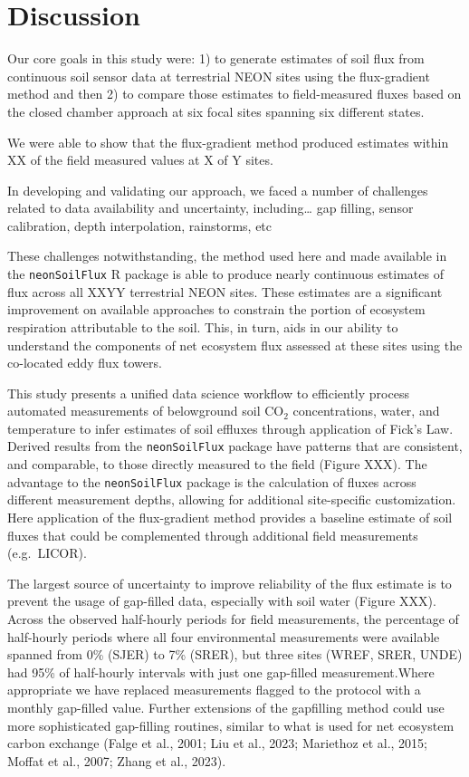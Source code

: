 \documentclass[
  letterpaper,
  DIV=11,
  numbers=noendperiod]{scrartcl}
\begin{document}
\section{Discussion}\label{discussion}

Our core goals in this study were: 1) to generate estimates of soil flux
from continuous soil sensor data at terrestrial NEON sites using the
flux-gradient method and then 2) to compare those estimates to
field-measured fluxes based on the closed chamber approach at six focal
sites spanning six different states.

We were able to show that the flux-gradient method produced estimates
within XX of the field measured values at X of Y sites.

In developing and validating our approach, we faced a number of
challenges related to data availability and uncertainty,
including\ldots{} gap filling, sensor calibration, depth interpolation,
rainstorms, etc

These challenges notwithstanding, the method used here and made
available in the \texttt{neonSoilFlux} R package is able to produce
nearly continuous estimates of flux across all XXYY terrestrial NEON
sites. These estimates are a significant improvement on available
approaches to constrain the portion of ecosystem respiration
attributable to the soil. This, in turn, aids in our ability to
understand the components of net ecosystem flux assessed at these sites
using the co-located eddy flux towers.

This study presents a unified data science workflow to efficiently
process automated measurements of belowground soil CO\(_{2}\)
concentrations, water, and temperature to infer estimates of soil
effluxes through application of Fick's Law. Derived results from the
\texttt{neonSoilFlux} package have patterns that are consistent, and
comparable, to those directly measured to the field (Figure XXX). The
advantage to the \texttt{neonSoilFlux} package is the calculation of
fluxes across different measurement depths, allowing for additional
site-specific customization. Here application of the flux-gradient
method provides a baseline estimate of soil fluxes that could be
complemented through additional field measurements (e.g.~LICOR).

The largest source of uncertainty to improve reliability of the flux
estimate is to prevent the usage of gap-filled data, especially with
soil water (Figure XXX). Across the observed half-hourly periods for
field measurements, the percentage of half-hourly periods where all four
environmental measurements were available spanned from 0\% (SJER) to 7\%
(SRER), but three sites (WREF, SRER, UNDE) had 95\% of half-hourly
intervals with just one gap-filled measurement.Where appropriate we have
replaced measurements flagged to the protocol with a monthly gap-filled
value. Further extensions of the gapfilling method could use more
sophisticated gap-filling routines, similar to what is used for net
ecosystem carbon exchange (Falge et al., 2001; Liu et al., 2023;
Mariethoz et al., 2015; Moffat et al., 2007; Zhang et al., 2023).
\end{document}
